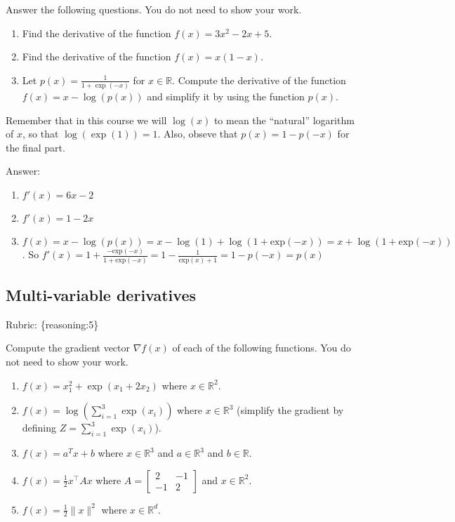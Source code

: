 \documentclass{article}
\def\rubric#1{\gre{Rubric: \{#1\}}}{}
\def\blu#1{{\color{blu}#1}}
\def\gre#1{{\color{gre}#1}}
\def\red#1{{\color{red}#1}}
\def\norm#1{\|#1\|}
\def\R{\mathbb{R}}
\def\half{\frac 1 2}
\begin{document}
\blu{Answer the following questions.} You do not need to show your work.

\begin{enumerate}
\item Find the derivative of the function $f(x) = 3x^2 -2x + 5$.
\item Find the derivative of the function $f(x) = x(1-x)$.
\item Let $p(x) = \frac{1}{1+\exp(-x)}$ for $x \in \R$. Compute the derivative of the function $f(x) = x-\log(p(x))$ and simplify it by using the function $p(x)$.
\end{enumerate}
Remember that in this course we will $\log(x)$ to mean the ``natural'' logarithm of $x$, so that $\log(\exp(1)) = 1$. Also, obseve that $p(x) = 1-p(-x)$ for the final part.

\red{Answer:
\begin{enumerate}
\item $f'(x) = 6x-2$
\item $f'(x) = 1-2x$
\item $f(x)=x-\log(p(x)) = x-\log(1)+\log(1+\text{exp}(-x))=x+\log(1+\text{exp}(-x))$. So $f'(x)=1+\frac{-\text{exp}(-x)}{1+\text{exp}(-x)}=1-\frac{1}{\text{exp}(x)+1}=1-p(-x)=p(x)$
\end{enumerate}
}
\subsection{Multi-variable derivatives}
\label{sub.multi.var}
\rubric{reasoning:5}

\blu{Compute the gradient vector $\nabla f(x)$ of each of the following functions.} You do not need to show your work.
\begin{enumerate}
\item $f(x) = x_1^2 + \exp(x_1 + 2x_2)$ where $x \in \R^2$.
\item $f(x) = \log\left(\sum_{i=1}^3\exp(x_i)\right)$ where $x \in \R^3$ (simplify the gradient by defining $Z = \sum_{i=1}^3\exp(x_i)$).
\item $f(x) = a^Tx + b$ where $x \in \R^3$ and $a \in \R^3$ and $b \in \R$.
\item $f(x) = \half x^\top A x$ where $A=\left[ \begin{array}{cc}
2 & -1 \\
 -1 & 2 \end{array} \right]$ and $x \in \mathbb{R}^2$.
 \item $f(x) = \frac{1}{2}\norm{x}^2$ where $x \in \R^d$.
\end{enumerate}
\end{document}
